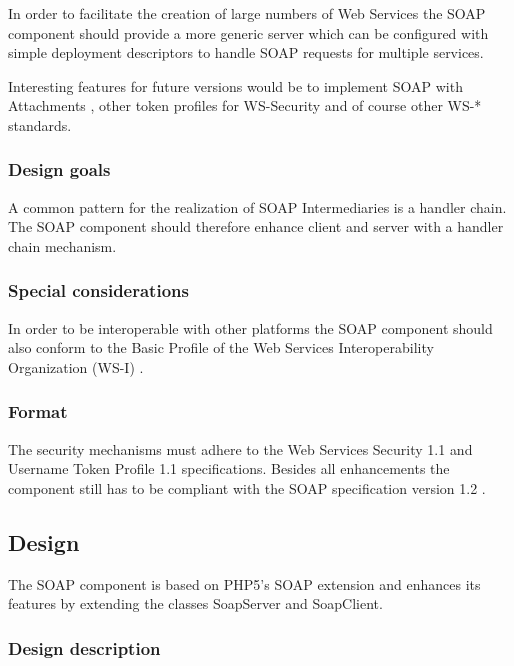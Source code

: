 \documentclass[10pt,final,a4paper,oneside]{article}
\begin{document}
In order to facilitate the creation
of large numbers of Web Services
the SOAP component should provide
a more generic server
which can be configured with simple
deployment descriptors to handle
SOAP requests for multiple services.

Interesting features for future versions would be
to implement SOAP with Attachments \cite{SwA},
other token profiles for WS-Security and of course
other WS-* standards.


\subsubsection{Design goals}
A common pattern for the realization of
SOAP Intermediaries is a handler chain.
The SOAP component should therefore
enhance client and server
with a handler chain mechanism.


\subsubsection{Special considerations}
In order to be interoperable with other platforms
the SOAP component should also conform
to the Basic Profile of the
Web Services Interoperability Organization (WS-I) \cite{BasicProfile}.


\subsubsection{Format}
The security mechanisms must adhere
to the Web Services Security 1.1 \cite{WSS}
and Username Token Profile 1.1 \cite{UTP}
specifications.
Besides all enhancements the component
still has to be compliant with
the SOAP specification version 1.2 \cite{SOAP}.


\subsection{Design}\label{subsec:SOAPDesign}
%
%
The SOAP component is based on PHP5's SOAP extension
and enhances its features by extending the classes
SoapServer and SoapClient.

\subsubsection{Design description}
\end{document}
